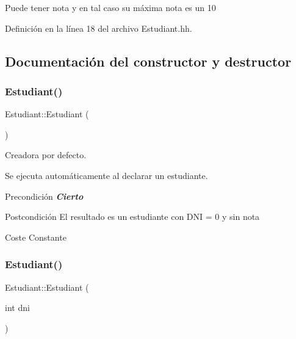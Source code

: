 Puede tener nota y en tal caso su máxima nota es un 10 

Definición en la línea 18 del archivo Estudiant.\+hh.



\subsection{Documentación del constructor y destructor}
\mbox{\label{class_estudiant_a88f7f46dd946fef9f7a71fdc608afd16}} 
\subsubsection{\texorpdfstring{Estudiant()}{Estudiant()}\hspace{0.1cm}{\footnotesize\ttfamily [1/2]}}
{\footnotesize\ttfamily Estudiant\+::\+Estudiant (\begin{DoxyParamCaption}{ }\end{DoxyParamCaption})}



Creadora por defecto. 

Se ejecuta automáticamente al declarar un estudiante. \begin{DoxyPrecond}{Precondición}
{\bfseries {\itshape Cierto}} 
\end{DoxyPrecond}
\begin{DoxyPostcond}{Postcondición}
El resultado es un estudiante con D\+NI = 0 y sin nota 
\end{DoxyPostcond}
\begin{DoxyParagraph}{Coste}
Constante 
\end{DoxyParagraph}
\mbox{\label{class_estudiant_ae0a9ebffe2ff8fb6cecc15a909206a1b}} 
\subsubsection{\texorpdfstring{Estudiant()}{Estudiant()}\hspace{0.1cm}{\footnotesize\ttfamily [2/2]}}
{\footnotesize\ttfamily Estudiant\+::\+Estudiant (\begin{DoxyParamCaption}\item[{int}]{dni }\end{DoxyParamCaption})}



